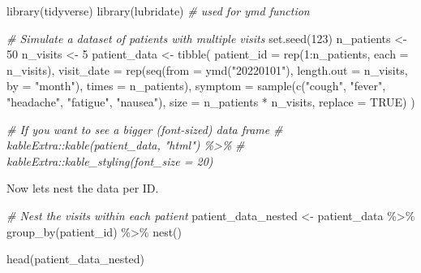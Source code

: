 \documentclass[
]{book}
\newenvironment{Shaded}{\begin{snugshade}}{\end{snugshade}}
\newcommand{\AttributeTok}[1]{\textcolor[rgb]{0.77,0.63,0.00}{#1}}
\newcommand{\CommentTok}[1]{\textcolor[rgb]{0.56,0.35,0.01}{\textit{#1}}}
\newcommand{\ConstantTok}[1]{\textcolor[rgb]{0.00,0.00,0.00}{#1}}
\newcommand{\DecValTok}[1]{\textcolor[rgb]{0.00,0.00,0.81}{#1}}
\newcommand{\FunctionTok}[1]{\textcolor[rgb]{0.00,0.00,0.00}{#1}}
\newcommand{\NormalTok}[1]{#1}
\newcommand{\OtherTok}[1]{\textcolor[rgb]{0.56,0.35,0.01}{#1}}
\newcommand{\SpecialCharTok}[1]{\textcolor[rgb]{0.00,0.00,0.00}{#1}}
\newcommand{\StringTok}[1]{\textcolor[rgb]{0.31,0.60,0.02}{#1}}
\begin{document}
\begin{Shaded}
\begin{Highlighting}[]
\FunctionTok{library}\NormalTok{(tidyverse)}
\FunctionTok{library}\NormalTok{(lubridate)  }\CommentTok{\# used for ymd function}

\CommentTok{\# Simulate a dataset of patients with multiple visits}
\FunctionTok{set.seed}\NormalTok{(}\DecValTok{123}\NormalTok{)}
\NormalTok{n\_patients }\OtherTok{\textless{}{-}} \DecValTok{50}
\NormalTok{n\_visits }\OtherTok{\textless{}{-}} \DecValTok{5}
\NormalTok{patient\_data }\OtherTok{\textless{}{-}} \FunctionTok{tibble}\NormalTok{(}
  \AttributeTok{patient\_id =} \FunctionTok{rep}\NormalTok{(}\DecValTok{1}\SpecialCharTok{:}\NormalTok{n\_patients, }\AttributeTok{each =}\NormalTok{ n\_visits),}
  \AttributeTok{visit\_date =} \FunctionTok{rep}\NormalTok{(}\FunctionTok{seq}\NormalTok{(}\AttributeTok{from =} \FunctionTok{ymd}\NormalTok{(}\StringTok{"20220101"}\NormalTok{), }\AttributeTok{length.out =}\NormalTok{ n\_visits, }\AttributeTok{by =} \StringTok{"month"}\NormalTok{), }\AttributeTok{times =}\NormalTok{ n\_patients),}
  \AttributeTok{symptom =} \FunctionTok{sample}\NormalTok{(}\FunctionTok{c}\NormalTok{(}\StringTok{"cough"}\NormalTok{, }\StringTok{"fever"}\NormalTok{, }\StringTok{"headache"}\NormalTok{, }\StringTok{"fatigue"}\NormalTok{, }\StringTok{"nausea"}\NormalTok{), }\AttributeTok{size =}\NormalTok{ n\_patients }\SpecialCharTok{*}\NormalTok{ n\_visits, }\AttributeTok{replace =} \ConstantTok{TRUE}\NormalTok{)}
\NormalTok{)}

\CommentTok{\# If you want to see a bigger (font{-}sized) data frame}
\CommentTok{\# kableExtra::kable(patient\_data, "html") \%\textgreater{}\%}
\CommentTok{\#   kableExtra::kable\_styling(font\_size = 20)}
\end{Highlighting}
\end{Shaded}

Now lets nest the data per ID.

\begin{Shaded}
\begin{Highlighting}[]
\CommentTok{\# Nest the visits within each patient}
\NormalTok{patient\_data\_nested }\OtherTok{\textless{}{-}}\NormalTok{ patient\_data }\SpecialCharTok{\%\textgreater{}\%} 
  \FunctionTok{group\_by}\NormalTok{(patient\_id) }\SpecialCharTok{\%\textgreater{}\%} 
  \FunctionTok{nest}\NormalTok{()}

\FunctionTok{head}\NormalTok{(patient\_data\_nested)}
\end{Highlighting}
\end{Shaded}
\end{document}
